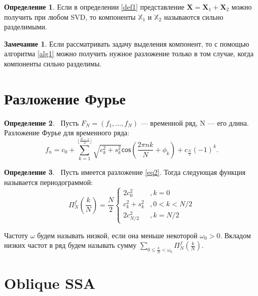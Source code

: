 \documentclass[specialist, substylefile = spbureport.rtx, subf,href,colorlinks=true, 12pt]{disser}
\theoremstyle{definition}
\newtheorem{definition}{Определение}
\newtheorem{remark}{Замечание}
\begin{document}
\begin{definition}
    Если в определении \ref{def1} представление $\mathbf{X} = \mathbf{X}_1 + \mathbf{X}_2$ можно получить при любом SVD, то компоненты $\mathbb{X}_1$ и $\mathbb{X}_2$ называются сильно разделимыми.
\end{definition}

\begin{remark}
    Если рассматривать задачу выделения компонент, то с помощью алгоритма \ref{alg1} можно получить нужное разложение только в том случае, когда компоненты сильно разделимы.
\end{remark}

\section{Разложение Фурье}
\begin{definition}
    ~Пусть $F_N=(f_1, \ldots, f_N)$ --- временной ряд, N --- его длина. Разложение Фурье для временного ряда:
    \begin{equation*} \label{eq2} \tag{1}
        f_n = c_0 + \sum\limits_{k = 1}^{\lfloor \frac{N - 1}{2}\rfloor} \sqrt{c_k^2 + s_k^2}\mathsf{cos}(\frac{2\pi nk}{N} + \phi_k) + c_{\frac{N}{2}}(-1)^k.
    \end{equation*}
\end{definition}
\begin{definition}
    ~Пусть имеется разложение \eqref{eq2}. Тогда следующая функция называется периодограммой:
    \begin{equation*}
                \Pi^f_N (\frac{k}{N}) = \frac{N}{2}
        \begin{cases}
        2c_0^2 & ,k = 0\\
        c_k^2+s_k^2 & ,0 < k < N/2\\
        2c^2_{N/2} & ,k = N/2
        \end{cases}
    \end{equation*}
\end{definition}
Частоту $\omega$ будем называть низкой, если она меньше некоторой $\omega_0 > 0$. Вкладом низких частот в ряд будем называть сумму $\sum\limits_{0 \leq \frac{k}{N} < \omega_0}\Pi_N^f(\frac{k}{N})$.

\section{Oblique SSA}
\end{document}
